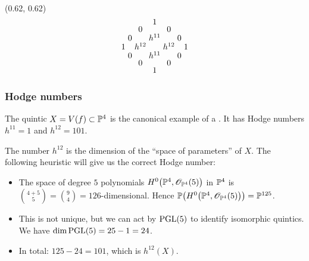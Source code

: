 \begin{frame}
{
    \begin{textblock}{0.4}(0.62, 0.62)
        \[
            \arraycolsep = 1.5pt
            \def\arraystretch{0.7}
            \begin{array}[c]{ccccccc}
                &&& 1                          \\
                &&  0 && 0                     \\
                &   0 && h^{11} && 0           \\
                    1 && h^{12} && h^{12} && 1 \\
                &   0 && h^{11} && 0           \\
                &&  0 && 0                     \\
                &&& 1 
            \end{array}
        \]
    \end{textblock}
}
\end{frame}

\begin{frame}
\frametitle{Hodge numbers}

The quintic $X = V(f) \subset \P^4$ is the canonical example of a \CY. It has Hodge numbers $h^{11}=1$ and $h^{12}=101$.

\begin{remark}[Heuristic]
    The number $h^{12}$ is the dimension of the ``space of parameters'' of $X$. The following heuristic will give us the correct Hodge number:
    \begin{itemize}
      \item
      The space of degree $5$ polynomials $H^0\big(\P^4, \OO_{\P^4}(5)\big)$ in $\P^4$ is $\binom{4 + 5}{5} = \binom{9}{4} = 126$-dimensional. Hence $\P\big(H^0\big(\P^4, \OO_{\P^4}(5)\big)\big) = \P^{125}$.
      \pause

      \item
      This is not unique, but we can act by $\PGL(5)$ to identify isomorphic quintics. We have $\dim \PGL(5)=25-1=24$.
      \pause

      \item
      In total: $125 - 24 = 101$, which is $h^{12}(X)$.
      \pause
    \end{itemize}
\end{remark}

\end{frame}